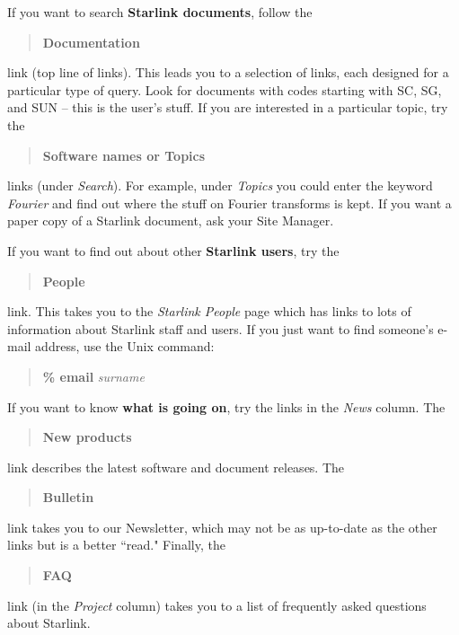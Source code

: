 \documentclass[twoside]{article}
\newcommand{\htmladdnormallink}[2]{#1}
\begin{document}
If you want to search {\bf Starlink documents}, follow the
\begin{quote}
\htmladdnormallink{\bf Documentation}
{http://star-www.rl.ac.uk/docs.html}
\end{quote}
link (top line of links).
This leads you to a selection of links, each designed for a particular type of
query.
Look for documents with codes starting with SC, SG, and SUN -- this is the
user's stuff.
If you are interested in a particular topic, try the
\begin{quote}
\htmladdnormallink{\bf Software names}
{http://star-www.rl.ac.uk/cgi-bin/ssilist/ssilist} {\rm or}
\htmladdnormallink{\bf Topics}
{http://star-www.rl.ac.uk/cgi-bin/htxfinder}
\end{quote}
links (under {\em Search}).
For example, under {\em Topics}\/ you could enter the keyword
{\em Fourier}\/ and find out where the stuff on Fourier transforms is kept.
If you want a paper copy of a Starlink document, ask your Site Manager.

If you want to find out about other {\bf Starlink users}, try the
\begin{quote}
\htmladdnormallink{\bf People}{http://star-www.rl.ac.uk/people.html}
\end{quote}
link.
This takes you to the {\em Starlink People}\/ page which has links to lots of
information about Starlink staff and users.
If you just want to find someone's e-mail address, use the Unix command:
\begin{quote}
{\bf \% email} {\it surname}
\end{quote}
If you want to know {\bf what is going on}, try the links in the {\em News}\/
column.
The
\begin{quote}
\htmladdnormallink{\bf New products}
{http://star-www.rl.ac.uk/\~{}cac/publicity/new_products.html}
\end{quote}
link describes the latest software and document releases.
The
\begin{quote}
\htmladdnormallink{\bf Bulletin}{http://star-www.rl.ac.uk/bulletin.html}
\end{quote}
link takes you to our Newsletter, which may not be as up-to-date as the other
links but is a better ``read."
Finally, the
\begin{quote}
\htmladdnormallink{\bf FAQ}
{http://star-www.rl.ac.uk/\~{}cac/publicity/starlink_faq.html}
\end{quote}
link (in the {\em Project}\/ column) takes you to a list of frequently asked
questions about Starlink.
\end{document}
